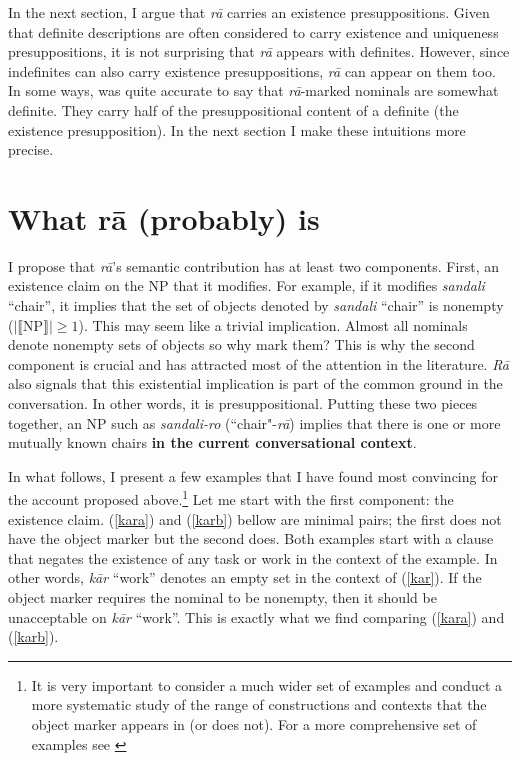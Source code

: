 \documentclass[12pt]{article}
\begin{document}
In the next section, I argue that \emph{r\={a}} carries an existence presuppositions. Given that definite descriptions are often considered to carry existence and uniqueness presuppositions, it is not surprising that \emph{r\={a}} appears with definites. However, since indefinites can also carry existence presuppositions, \emph{r\={a}} can appear on them too. In some ways, \cite{mahootian1997} was quite accurate to say that \emph{r\={a}}-marked nominals are somewhat definite. They carry half of the presuppositional content of a definite (the existence presupposition). In the next section I make these intuitions more precise. 

\section {What r\={a} (probably) is} \label {myaccount}

I propose that \emph{r\={a}}'s semantic contribution has at least two components. First, an existence claim on the NP that it modifies. For example, if it modifies \textit{sandali} ``chair'', it implies that the set of objects denoted by \textit{sandali} ``chair'' is nonempty ($|\llbracket$NP$\rrbracket| \geq 1$). This may seem like a trivial implication. Almost all nominals denote nonempty sets of objects so why mark them? This is why the second component is crucial and has attracted most of the attention in the literature. \emph{R\={a}} also signals that this existential implication is part of the common ground in the conversation. In other words, it is presuppositional. Putting these two pieces together, an NP such as \textit{sandali-ro} (``chair"-\emph{r\={a}}) implies that there is one or more mutually known chairs \textbf{in the current conversational context}. 

In what follows, I present a few examples that I have found most convincing for the account proposed above.\footnote{It is very important to consider a much wider set of examples and conduct a more systematic study of the range of constructions and contexts that the object marker appears in (or does not). For a more comprehensive set of examples see \cite{jasbi2014}} Let me start with the first component: the existence claim. (\ref{kara}) and (\ref{karb}) bellow are minimal pairs; the first does not have the object marker but the second does. Both examples start with a clause that negates the existence of any task or work in the context of the example. In other words, \emph{k\={a}r} ``work'' denotes an empty set in the context of (\ref{kar}). If the object marker requires the nominal to be nonempty, then it should be unacceptable on \emph{k\={a}r} ``work''. This is exactly what we find comparing (\ref{kara}) and (\ref{karb}).
\end{document}
